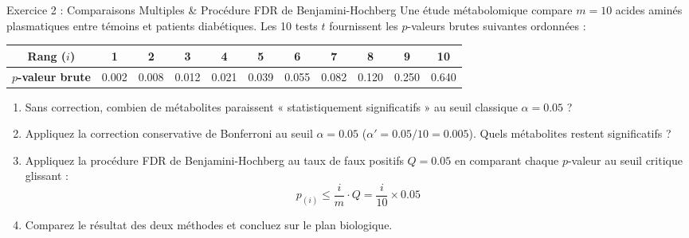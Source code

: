 \documentclass[11pt,a4paper]{article}
\begin{document}
\begin{exercicebox}{Exercice 2 : Comparaisons Multiples \& Procédure FDR de Benjamini-Hochberg}
Une étude métabolomique compare $m = 10$ acides aminés plasmatiques entre témoins et patients diabétiques. Les 10 tests $t$ fournissent les $p$-valeurs brutes suivantes ordonnées :
\begin{center}
\small
\begin{tabular}{ccccccccccc}
\toprule
\textbf{Rang ($i$)} & 1 & 2 & 3 & 4 & 5 & 6 & 7 & 8 & 9 & 10 \\
\midrule
\textbf{$p$-valeur brute} & 0.002 & 0.008 & 0.012 & 0.021 & 0.039 & 0.055 & 0.082 & 0.120 & 0.250 & 0.640 \\
\bottomrule
\end{tabular}
\end{center}
\begin{enumerate}[label=\textbf{\alph*.}]
  \item Sans correction, combien de métabolites paraissent « statistiquement significatifs » au seuil classique $\alpha = 0.05$ ?
  \item Appliquez la correction conservative de Bonferroni au seuil $\alpha = 0.05$ ($\alpha' = 0.05 / 10 = 0.005$). Quels métabolites restent significatifs ?
  \item Appliquez la procédure FDR de Benjamini-Hochberg au taux de faux positifs $Q = 0.05$ en comparant chaque $p$-valeur au seuil critique glissant :
  \begin{equation*}
    p_{(i)} \le \frac{i}{m} \cdot Q = \frac{i}{10} \times 0.05
  \end{equation*}
  \item Comparez le résultat des deux méthodes et concluez sur le plan biologique.
\end{enumerate}
\end{exercicebox}
\end{document}
